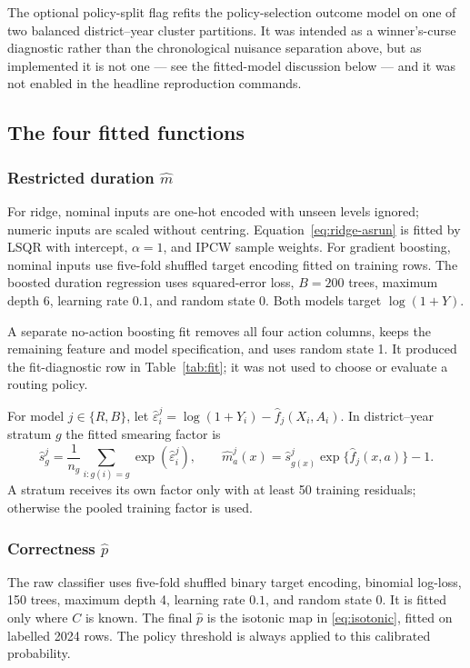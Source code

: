 \documentclass[11pt,a4paper]{article}
\theoremstyle{plain}
\theoremstyle{definition}
\theoremstyle{remark}
\begin{document}
The optional policy-split flag refits the policy-selection outcome model on one of two balanced
district--year cluster partitions. It was intended as a winner's-curse diagnostic rather than the
chronological nuisance separation above, but as implemented it is not one --- see the fitted-model
discussion below --- and it was not enabled in the headline reproduction commands.

\subsection{The four fitted functions}

\subsubsection*{Restricted duration $\hat m$}

For ridge, nominal inputs are one-hot encoded with unseen levels ignored; numeric inputs are
scaled without centring. Equation~\eqref{eq:ridge-asrun} is fitted by LSQR with intercept,
$\alpha=1$, and IPCW sample weights. For gradient boosting, nominal inputs use five-fold shuffled
target encoding fitted on training rows. The boosted duration regression uses squared-error loss,
$B=200$ trees, maximum depth 6, learning rate $0.1$, and random state 0. Both models target
$\log(1+Y)$.

A separate no-action boosting fit removes all four action columns, keeps the remaining feature
and model specification, and uses random state 1. It produced the fit-diagnostic row in
Table~\ref{tab:fit}; it was not used to choose or evaluate a routing policy.

For model $j\in\{R,B\}$, let
$\hat\varepsilon_i^j=\log(1+Y_i)-\hat f_j(X_i,A_i)$. In district--year stratum $g$ the fitted
smearing factor is
\begin{equation}
\hat s_g^j=\frac1{n_g}\sum_{i:g(i)=g}\exp(\hat\varepsilon_i^j),
\qquad
\hat m_a^j(x)=\hat s_{g(x)}^j\exp\{\hat f_j(x,a)\}-1.
\label{eq:asrun-smear}
\end{equation}
A stratum receives its own factor only with at least 50 training residuals; otherwise the pooled
training factor is used.

\subsubsection*{Correctness $\hat p$}

The raw classifier uses five-fold shuffled binary target encoding, binomial log-loss, 150 trees,
maximum depth 4, learning rate $0.1$, and random state 0. It is fitted only where $C$ is known.
The final $\hat p$ is the isotonic map in \eqref{eq:isotonic}, fitted on labelled 2024 rows. The
policy threshold is always applied to this calibrated probability.
\end{document}
